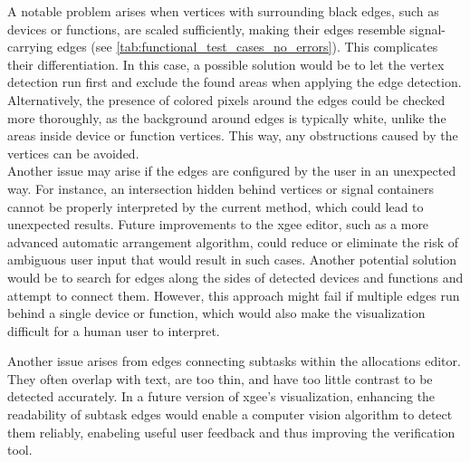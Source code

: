 A notable problem arises when vertices with surrounding black edges, such as devices or functions, are scaled sufficiently, making their edges resemble signal-carrying edges (see \autoref  {tab:functional_test_cases_no_errors}). This complicates their differentiation. In this case, a possible solution would be to let the vertex detection run first and exclude the found areas when applying the edge detection. Alternatively, the presence of colored pixels around the edges could be checked more thoroughly, as the background around edges is typically white, unlike the areas inside device or function vertices. This way, any obstructions caused by the vertices can be avoided.\\
Another issue may arise if the edges are configured by the user in an unexpected way. For instance, an intersection hidden behind vertices or signal containers cannot be properly interpreted by the current method, which could lead to unexpected results. Future improvements to the \acrshort{xgee} editor, such as a more advanced automatic arrangement algorithm, could reduce or eliminate the risk of ambiguous user input that would result in such cases. Another potential solution would be to search for edges along the sides of detected devices and functions and attempt to connect them. However, this approach might fail if multiple edges run behind a single device or function, which would also make the visualization difficult for a human user to interpret.

Another issue arises from edges connecting subtasks within the allocations editor. They often overlap with text, are too thin, and have too little contrast to be detected accurately. In a future version of \acrshort{xgee}'s visualization, enhancing the readability of subtask edges would enable a computer vision algorithm to detect them reliably, enabeling useful user feedback and thus improving the verification tool.

